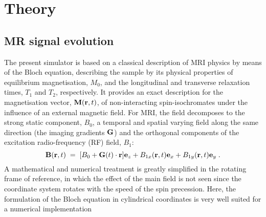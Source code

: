 \documentclass{nic-series}
\begin{document}
\section{Theory}
\subsection{MR signal evolution}
The present simulator is based on a classical description of MRI physics by means of the  Bloch equation, describing the sample by its
physical properties of equilibrium magnetisation, $M_0$, and the longitudinal and transverse relaxation times, $T_1$ and $T_2$, respectively.
It provides an exact description for the magnetisation vector, ${\bf M}({\bf r},t)$, of non-interacting spin-isochromates under the influence of
an external magnetic field. For MRI, the field decomposes to the strong static component, $B_0$, a temporal and spatial varying field along
the same direction (the imaging gradients ${\bf G}$) and the orthogonal components of the excitation radio-frequency (RF) field, $B_1$:
\begin{equation}\label{eq:field}
	{\bf B}({\bf r},t)\;=\;[B_0+{\bf G}(t)\cdot{\bf r}]{\bf e}_z+B_{1x}({\bf r},t){\bf e}_x+B_{1y}({\bf r},t){\bf e}_y\;.
\end{equation}
A mathematical and numerical treatment is greatly simplified in the rotating frame of reference, in which the effect of the main field is not seen
since the coordinate system rotates with the speed of the spin precession. Here, the formulation of the Bloch equation in cylindrical coordinates is
very well suited for a numerical implementation
\end{document}
